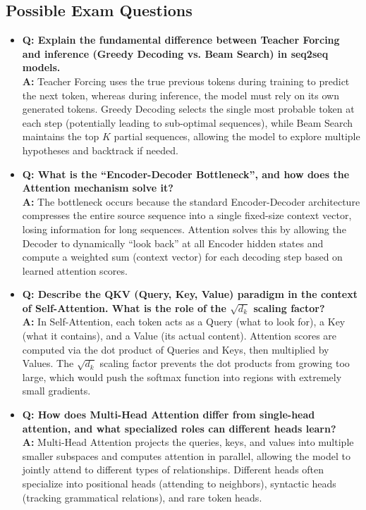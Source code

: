 \subsection{Possible Exam Questions}
\begin{itemize}
    \item \textbf{Q: Explain the fundamental difference between Teacher Forcing and inference (Greedy Decoding vs. Beam Search) in seq2seq models.} \\
    \textbf{A:} Teacher Forcing uses the true previous tokens during training to predict the next token, whereas during inference, the model must rely on its own generated tokens. Greedy Decoding selects the single most probable token at each step (potentially leading to sub-optimal sequences), while Beam Search maintains the top $K$ partial sequences, allowing the model to explore multiple hypotheses and backtrack if needed.
    
    \item \textbf{Q: What is the ``Encoder-Decoder Bottleneck'', and how does the Attention mechanism solve it?} \\
    \textbf{A:} The bottleneck occurs because the standard Encoder-Decoder architecture compresses the entire source sequence into a single fixed-size context vector, losing information for long sequences. Attention solves this by allowing the Decoder to dynamically ``look back'' at all Encoder hidden states and compute a weighted sum (context vector) for each decoding step based on learned attention scores.

    \item \textbf{Q: Describe the QKV (Query, Key, Value) paradigm in the context of Self-Attention. What is the role of the $\sqrt{d_k}$ scaling factor?} \\
    \textbf{A:} In Self-Attention, each token acts as a Query (what to look for), a Key (what it contains), and a Value (its actual content). Attention scores are computed via the dot product of Queries and Keys, then multiplied by Values. The $\sqrt{d_k}$ scaling factor prevents the dot products from growing too large, which would push the softmax function into regions with extremely small gradients.

    \item \textbf{Q: How does Multi-Head Attention differ from single-head attention, and what specialized roles can different heads learn?} \\
    \textbf{A:} Multi-Head Attention projects the queries, keys, and values into multiple smaller subspaces and computes attention in parallel, allowing the model to jointly attend to different types of relationships. Different heads often specialize into positional heads (attending to neighbors), syntactic heads (tracking grammatical relations), and rare token heads.


\end{itemize}
